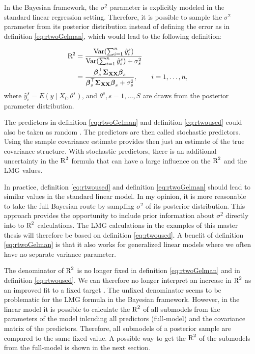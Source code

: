 \documentclass[11pt,a4paper,twoside]{book}
\begin{document}
In the Bayesian framework, the $\sigma^2$ parameter is explicitly modeled in the standard linear regression setting. Therefore, it is possible to sample the $\sigma^2$ parameter from its posterior distribution instead of defining the error as in definition \eqref{eq:rtwoGelman}, which would lead to the following definition:

    \begin{align} 
        \text{R}^2 &= \frac{\operatorname{Var}(\sum_{i=1}^{n}\hat{y}^s_{i})}{\operatorname{Var}(\sum_{i=1}^{n}\hat{y}^s_{i})+\sigma_{s}^2} \nonumber \\ &= \frac{{\boldsymbol{\beta}}_{s}^\top {\boldsymbol{\Sigma}}{}_{{\mathbf{X}} {\mathbf{X}}}  {\boldsymbol{\beta}}_{s}}{{\boldsymbol{\beta}}_{s}^\top {\boldsymbol{\Sigma}}{}_{{\mathbf{X}} {\mathbf{X}}}  {\boldsymbol{\beta}}_{s}+\sigma_{s}^2}, \qquad i = 1,\dots,n, \label{eq:rtwoused} 
   \end{align} 
where $\hat{y}^s_{i}  = E \left({y \mid X_{i}, \theta^s}\right) $,  and $\theta^s, s = 1,\dotsc, S$ are draws from the posterior parameter distribution.


The predictors in definition \eqref{eq:rtwoGelman} and definition \eqref{eq:rtwoused} could also be taken as random \citep{Gelman2017}. The predictors are then called stochastic predictors. Using the sample covariance estimate provides then just an estimate of the true covariance structure. With stochastic predictors, there is an additional uncertainty in the $\text{R}^2$ formula that can have a large influence on the $\text{R}^2$ and the LMG values.

In practice, definition \eqref{eq:rtwoused} and definition \eqref{eq:rtwoGelman} should lead to  similar values in the standard linear model. In my opinion, it is more reasonable to take the full Bayesian route by sampling  $\sigma^2$ of its posterior distribution. This approach provides the opportunity to include prior information about $\sigma^2$ directly into to $\text{R}^2$ calculations. The LMG calculations in the examples of this master thesis will therefore be based on definition \eqref{eq:rtwoused}.  A benefit of definition \eqref{eq:rtwoGelman} is that it also works for generalized linear models where we often have no separate variance parameter.

The denominator of $\text{R}^2$ is no longer fixed in definition \eqref{eq:rtwoGelman} and in definition \eqref{eq:rtwoused}. We can therefore no longer interpret an increase in $\text{R}^2$ as an improved fit to a fixed target \citep{Gelman2017}. The unfixed denominator seems to be problematic for the LMG formula in the Bayesian framework. However, in the linear model it is possible to calculate the $\text{R}^2$ of all submodels from the parameters of the model inlcuding all predictors (full-model) and the covariance matrix of the predictors. Therefore,  all submodels of a posterior sample are compared to the same fixed value. A possible way to get the $\text{R}^2$ of the submodels from the full-model is shown in the next section.
\end{document}
